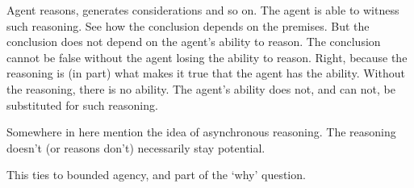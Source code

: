 \documentclass[10pt]{article}
\begin{document}
\begin{note}
Agent reasons, generates considerations and so on.
The agent is able to witness such reasoning.
See how the conclusion depends on the premises.
But the conclusion does not depend on the agent's ability to reason.
The conclusion cannot be false without the agent losing the ability to reason.
Right, because the reasoning is (in part) what makes it true that the agent has the ability.
Without the reasoning, there is no ability.
The agent's ability does not, and can not, be substituted for such reasoning.
\end{note}

\begin{note}[Async]
  Somewhere in here mention the idea of asynchronous reasoning.
  The reasoning doesn't (or reasons don't) necessarily stay potential.

  This ties to bounded agency, and part of the `why' question.
\end{note}
\end{document}
